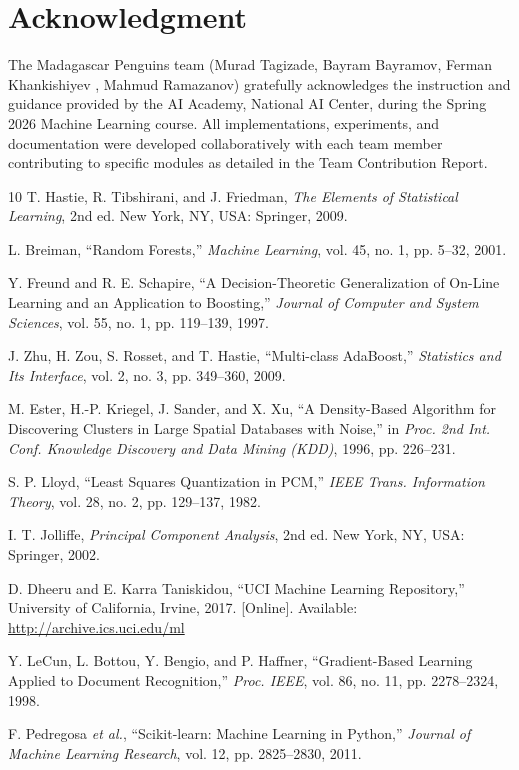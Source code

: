 \documentclass[conference,12pt]{IEEEtran}
\begin{document}
\section*{Acknowledgment}

The Madagascar Penguins team (Murad Tagizade, Bayram Bayramov, Ferman Khankishiyev , Mahmud Ramazanov) gratefully acknowledges the instruction and guidance provided by the AI Academy, National AI Center, during the Spring 2026 Machine Learning course. All implementations, experiments, and documentation were developed collaboratively with each team member contributing to specific modules as detailed in the Team Contribution Report.

\begin{thebibliography}{10}
T. Hastie, R. Tibshirani, and J. Friedman, \emph{The Elements of Statistical Learning}, 2nd ed. New York, NY, USA: Springer, 2009.

L. Breiman, ``Random Forests,'' \emph{Machine Learning}, vol. 45, no. 1, pp. 5--32, 2001.

Y. Freund and R. E. Schapire, ``A Decision-Theoretic Generalization of On-Line Learning and an Application to Boosting,'' \emph{Journal of Computer and System Sciences}, vol. 55, no. 1, pp. 119--139, 1997.

J. Zhu, H. Zou, S. Rosset, and T. Hastie, ``Multi-class AdaBoost,'' \emph{Statistics and Its Interface}, vol. 2, no. 3, pp. 349--360, 2009.

M. Ester, H.-P. Kriegel, J. Sander, and X. Xu, ``A Density-Based Algorithm for Discovering Clusters in Large Spatial Databases with Noise,'' in \textit{Proc. 2nd Int. Conf. Knowledge Discovery and Data Mining (KDD)}, 1996, pp. 226--231.

S. P. Lloyd, ``Least Squares Quantization in PCM,'' \textit{IEEE Trans. Information Theory}, vol. 28, no. 2, pp. 129--137, 1982.

I. T. Jolliffe, \emph{Principal Component Analysis}, 2nd ed. New York, NY, USA: Springer, 2002.

D. Dheeru and E. Karra Taniskidou, ``UCI Machine Learning Repository,'' University of California, Irvine, 2017. [Online]. Available: \url{http://archive.ics.uci.edu/ml}

Y. LeCun, L. Bottou, Y. Bengio, and P. Haffner, ``Gradient-Based Learning Applied to Document Recognition,'' \textit{Proc. IEEE}, vol. 86, no. 11, pp. 2278--2324, 1998.

F. Pedregosa \textit{et al.}, ``Scikit-learn: Machine Learning in Python,'' \textit{Journal of Machine Learning Research}, vol. 12, pp. 2825--2830, 2011.

\end{thebibliography}
\end{document}
